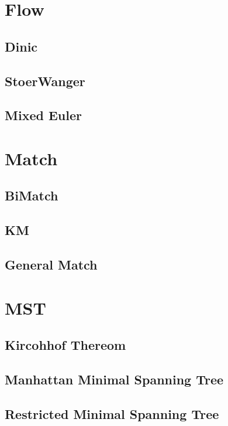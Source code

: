 \documentclass[10pt,twocolumn,oneside]{article}
\begin{document}
    \section{Flow}
    \subsection{Dinic}
    
    \subsection{StoerWanger}
    
    \subsection{Mixed Euler}
    
    \newpage

    \section{Match}
    \subsection{BiMatch}
    
    \subsection{KM}
    
    \subsection{General Match}
    
    \newpage

    \section{MST}
    \subsection{Kircohhof Thereom}
    
    \subsection{Manhattan Minimal Spanning Tree}
    
    \subsection{Restricted Minimal Spanning Tree}
    
\end{document}
